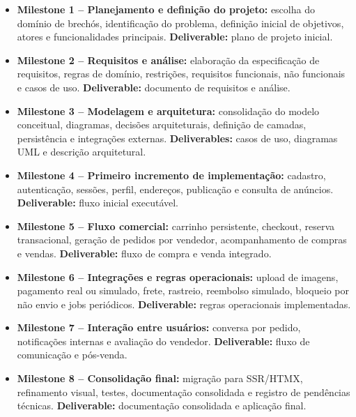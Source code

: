 ﻿\documentclass[12pt,a4paper]{article}
\begin{document}
\begin{itemize}
    \item \textbf{Milestone 1 -- Planejamento e definição do projeto:} escolha do domínio de brechós, identificação do problema, definição inicial de objetivos, atores e funcionalidades principais. \textbf{Deliverable:} plano de projeto inicial.

    \item \textbf{Milestone 2 -- Requisitos e análise:} elaboração da especificação de requisitos, regras de domínio, restrições, requisitos funcionais, não funcionais e casos de uso. \textbf{Deliverable:} documento de requisitos e análise.

    \item \textbf{Milestone 3 -- Modelagem e arquitetura:} consolidação do modelo conceitual, diagramas, decisões arquiteturais, definição de camadas, persistência e integrações externas. \textbf{Deliverables:} casos de uso, diagramas UML e descrição arquitetural.

    \item \textbf{Milestone 4 -- Primeiro incremento de implementação:} cadastro, autenticação, sessões, perfil, endereços, publicação e consulta de anúncios. \textbf{Deliverable:} fluxo inicial executável.

    \item \textbf{Milestone 5 -- Fluxo comercial:} carrinho persistente, checkout, reserva transacional, geração de pedidos por vendedor, acompanhamento de compras e vendas. \textbf{Deliverable:} fluxo de compra e venda integrado.

    \item \textbf{Milestone 6 -- Integrações e regras operacionais:} upload de imagens, pagamento real ou simulado, frete, rastreio, reembolso simulado, bloqueio por não envio e jobs periódicos. \textbf{Deliverable:} regras operacionais implementadas.

    \item \textbf{Milestone 7 -- Interação entre usuários:} conversa por pedido, notificações internas e avaliação do vendedor. \textbf{Deliverable:} fluxo de comunicação e pós-venda.

    \item \textbf{Milestone 8 -- Consolidação final:} migração para SSR/HTMX, refinamento visual, testes, documentação consolidada e registro de pendências técnicas. \textbf{Deliverable:} documentação consolidada e aplicação final.
\end{itemize}
\end{document}
